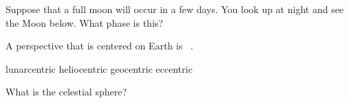 \documentclass[addpoints]{exam}
\begin{document}
\begin{questions}
\begin{minipage}{0.3\textwidth}
\end{minipage}%
\begin{minipage}{0.3\textwidth}
\end{minipage}

\question
Suppose that a full moon will occur in a few days. You look up at night and see the Moon below. What phase is this?

\begin{minipage}{0.3\textwidth}
\end{minipage}%
\begin{minipage}{0.3\textwidth}
\end{minipage}

\question
A perspective that is centered on Earth is \fillin\ .

\begin{choices}
\choice lunarcentric
\choice heliocentric
\correctchoice geocentric
\choice eccentric
\end{choices}


\question
What is the celestial sphere?



\end{questions}
\end{document}
